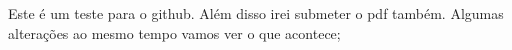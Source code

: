 \documentclass{article}
\begin{document}
  Este é um teste para o github.
	Além disso irei submeter o pdf também.
	Algumas alterações ao mesmo tempo vamos ver o que acontece;
\end{document}
